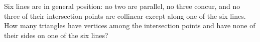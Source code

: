 Six lines are in general position: no two are parallel, no three concur, and no three of their intersection points are collinear except along one of the six lines. How many triangles have vertices among the intersection points and have none of their sides on one of the six lines?
